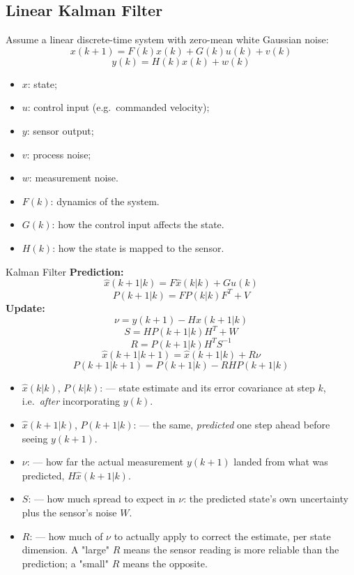 \subsection{Linear Kalman Filter}
Assume a linear discrete-time system with zero-mean white Gaussian noise:
\[
x(k{+}1)=F(k)x(k)+G(k)u(k)+v(k)
\]
\[
y(k)=H(k)x(k)+w(k)
\]
\begin{itemize}
\item $x$: state; 
\item $u$: control input (e.g.\ commanded velocity); 
\item $y$: sensor output; 
\item $v$: process noise; 
\item $w$: measurement noise.
\item $F(k)$: dynamics of the system.
\item $G(k)$: how the control input affects the state.
\item $H(k)$: how the state is mapped to the sensor.
\end{itemize}

\begin{defbox}{Kalman Filter}
\textbf{Prediction:}
\[
\hat x(k{+}1|k)=F\hat x(k|k)+Gu(k)
\]
\[
P(k{+}1|k)=FP(k|k)F^T+V
\]
\textbf{Update:}
\[
\nu=y(k{+}1)-H\hat x(k{+}1|k)
\]
\[
S=HP(k{+}1|k)H^T+W
\]
\[
R=P(k{+}1|k)H^TS^{-1}
\]
\[
\hat x(k{+}1|k{+}1)=\hat x(k{+}1|k)+R\nu
\]
\[
P(k{+}1|k{+}1)=P(k{+}1|k)-RHP(k{+}1|k)
\]
\end{defbox}
\begin{itemize}
\item $\hat x(k|k)$, $P(k|k)$:  --- state estimate and its error covariance at step $k$, i.e.\ \emph{after} incorporating $y(k)$.
\item $\hat x(k{+}1|k)$, $P(k{+}1|k)$:  --- the same, \emph{predicted} one step ahead before seeing $y(k{+}1)$.
\item $\nu$:  --- how far the actual measurement $y(k{+}1)$ landed from what was predicted, $H\hat x(k{+}1|k)$.
\item $S$:  --- how much spread to expect in $\nu$: the predicted state's own uncertainty plus the sensor's noise $W$.
\item $R$:  --- how much of $\nu$ to actually apply to correct the estimate, per state dimension. A "large" $R$ means the sensor reading is more reliable than the prediction; a "small" $R$ means the opposite.
\end{itemize}

